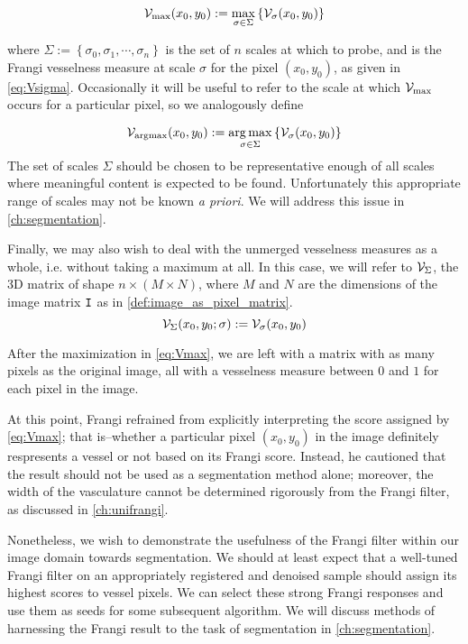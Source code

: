     \begin{equation} \label{eq:Vmax}
    \mathcal{V}_{\max}(x_0, y_0) :=
    	\underset{\sigma \in \Sigma}{\max}\left\{  \mathcal{V}_{\sigma} (x_0, y_0) \right\}
    \end{equation}
    
    where $\Sigma := \left\{ \sigma_0, \sigma_1 , \cdots, \sigma_n \right\}$ is
    the set of $n$ scales at which to probe, and \Vsigma is the Frangi vesselness measure at scale $\sigma$ for the pixel $(x_0,y_0)$, as given in \cref{eq:Vsigma}.
    Occasionally it will be useful to refer to the scale at which $\mathcal{V}_{\max}$ occurs for a 
    particular pixel, so we analogously define
    
    \begin{equation} \label{eq:Vargmax}
    \mathcal{V}_{\mathrm{argmax}}(x_0, y_0) := \underset{\sigma \in \Sigma}{\arg\max}\left\{  \mathcal{V}_{\sigma} (x_0, y_0) \right\}
    \end{equation}
The set of scales $\Sigma$ should be chosen to be representative enough of all scales where meaningful content is expected to be found. Unfortunately this appropriate range of scales may not be known \textit{a priori}. We will address this issue in \cref{ch:segmentation}.

Finally, we may also wish to deal with the unmerged vesselness measures as a whole, i.e. without taking a maximum at all. In this case, we will refer to $\mathcal{V}_{\Sigma}$, the 3D matrix of shape
$n \times (M\times N)$, where $M$ and $N$ are the dimensions of the image matrix $\mathtt{I}$
as in \cref{def:image_as_pixel_matrix}.
	\begin{equation} \label{eq:VSigma}
	\mathcal{V}_{\Sigma}(x_0,y_0 ; \sigma) := \mathcal{V}_{\sigma}(x_0,y_0)
\end{equation}

    
    After the maximization in \cref{eq:Vmax}, we are left with a matrix with as many pixels as the original image, all with a vesselness measure between $0$ and $1$ for each pixel in the image.
         
    At this point, Frangi \cite{frangi-paper} refrained from explicitly interpreting the score assigned by \cref{eq:Vmax}; that is--whether a particular pixel $(x_0,y_0)$ in the image definitely respresents a vessel or not based on its Frangi score. Instead, he cautioned that the result should not be used as a segmentation method alone; moreover, the width of the vasculature cannot be determined rigorously from the Frangi filter, as discussed in \cref{ch:unifrangi}. 
   
    Nonetheless, we wish to demonstrate the usefulness of the Frangi filter within our image domain towards segmentation. We should at least expect that a well-tuned Frangi filter on an appropriately registered and denoised sample should assign its highest scores to vessel pixels. We can select these strong Frangi responses and use them as seeds for some subsequent algorithm. We will discuss methods of harnessing the Frangi result to the task of segmentation in \cref{ch:segmentation}.
    
